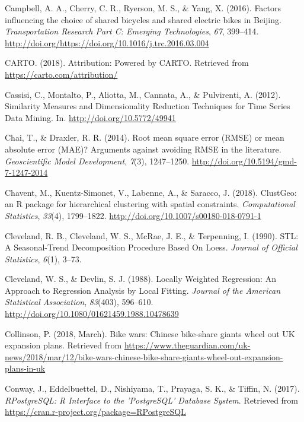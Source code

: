 \documentclass[12pt,oneside]{reedthesis}
\begin{document}
\hypertarget{ref-campbell2016}{}
Campbell, A. A., Cherry, C. R., Ryerson, M. S., \& Yang, X. (2016).
Factors influencing the choice of shared bicycles and shared electric
bikes in Beijing. \emph{Transportation Research Part C: Emerging
Technologies}, \emph{67}, 399--414.
\url{http://doi.org/https://doi.org/10.1016/j.trc.2016.03.004}

\hypertarget{ref-carto}{}
CARTO. (2018). Attribution: Powered by CARTO. Retrieved from
\url{https://carto.com/attribution/}

\hypertarget{ref-cassisi2012}{}
Cassisi, C., Montalto, P., Aliotta, M., Cannata, A., \& Pulvirenti, A.
(2012). Similarity Measures and Dimensionality Reduction Techniques for
Time Series Data Mining. In. \url{http://doi.org/10.5772/49941}

\hypertarget{ref-chai2014}{}
Chai, T., \& Draxler, R. R. (2014). Root mean square error (RMSE) or
mean absolute error (MAE)? Arguments against avoiding RMSE in the
literature. \emph{Geoscientific Model Development}, \emph{7}(3),
1247--1250. \url{http://doi.org/10.5194/gmd-7-1247-2014}

\hypertarget{ref-clustgeo}{}
Chavent, M., Kuentz-Simonet, V., Labenne, A., \& Saracco, J. (2018).
ClustGeo: an R package for hierarchical clustering with spatial
constraints. \emph{Computational Statistics}, \emph{33}(4), 1799--1822.
\url{http://doi.org/10.1007/s00180-018-0791-1}

\hypertarget{ref-cleveland1990}{}
Cleveland, R. B., Cleveland, W. S., McRae, J. E., \& Terpenning, I.
(1990). STL: A Seasonal-Trend Decomposition Procedure Based On Loess.
\emph{Journal of Official Statistics}, \emph{6}(1), 3--73.

\hypertarget{ref-cleveland1988}{}
Cleveland, W. S., \& Devlin, S. J. (1988). Locally Weighted Regression:
An Approach to Regression Analysis by Local Fitting. \emph{Journal of
the American Statistical Association}, \emph{83}(403), 596--610.
\url{http://doi.org/10.1080/01621459.1988.10478639}

\hypertarget{ref-guardian2}{}
Collinson, P. (2018, March). Bike wars: Chinese bike-share giants wheel
out UK expansion plans. Retrieved from
\url{https://www.theguardian.com/uk-news/2018/mar/12/bike-wars-chinese-bike-share-giants-wheel-out-expansion-plans-in-uk}

\hypertarget{ref-RPostgreSQL}{}
Conway, J., Eddelbuettel, D., Nishiyama, T., Prayaga, S. K., \& Tiffin,
N. (2017). \emph{RPostgreSQL: R Interface to the 'PostgreSQL' Database
System}. Retrieved from
\url{https://cran.r-project.org/package=RPostgreSQL}
\end{document}
